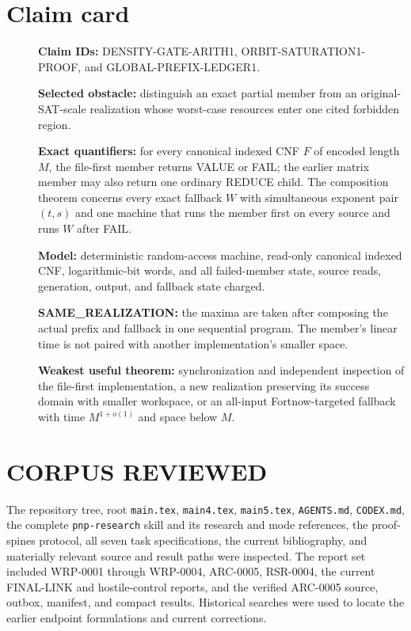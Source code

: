 \documentclass[11pt]{article}
\begin{document}
\section{Claim card}
\begin{description}
\item[] \textbf{Claim IDs:} DENSITY-GATE-ARITH1,
ORBIT-SATURATION1-PROOF, and GLOBAL-PREFIX-LEDGER1.
\item[] \textbf{Selected obstacle:} distinguish an exact partial member from
an original-SAT-scale realization whose worst-case resources enter one cited
forbidden region.
\item[] \textbf{Exact quantifiers:} for every canonical indexed CNF $F$ of
encoded length $M$, the file-first member returns VALUE or FAIL; the earlier
matrix member may also return one ordinary REDUCE child.  The composition
theorem concerns every exact fallback $W$
with simultaneous exponent pair $(t,s)$ and one machine that runs the member
first on every source and runs $W$ after FAIL.
\item[] \textbf{Model:} deterministic random-access machine, read-only
canonical indexed CNF, logarithmic-bit words, and all failed-member state,
source reads, generation, output, and fallback state charged.
\item[] \textbf{SAME\_REALIZATION:} the maxima are taken after composing the
actual prefix and fallback in one sequential program.  The member's linear
time is not paired with another implementation's smaller space.
\item[] \textbf{Weakest useful theorem:} synchronization and independent
inspection of the file-first implementation, a new realization preserving
its success domain with smaller workspace, or an all-input
Fortnow-targeted fallback with time $M^{1+o(1)}$ and space below $M$.
\end{description}

\section{CORPUS REVIEWED}
The repository tree, root \texttt{main.tex}, \texttt{main4.tex},
\texttt{main5.tex}, \texttt{AGENTS.md}, \texttt{CODEX.md}, the complete
\texttt{pnp-research} skill and its research and mode references, the
proof-spines protocol, all seven task specifications, the current bibliography,
and materially relevant source and result paths were inspected.  The report
set included WRP-0001 through WRP-0004, ARC-0005, RSR-0004, the current
FINAL-LINK and hostile-control reports, and the verified ARC-0005 source,
outbox, manifest, and compact results.  Historical searches were used to
locate the earlier endpoint formulations and current corrections.
\end{document}
